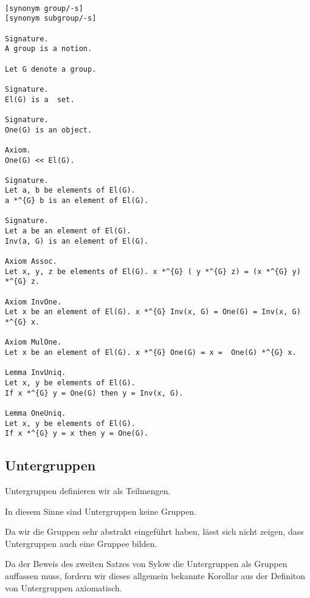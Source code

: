 \documentclass[a4paper,12pt]{scrartcl}
\begin{document}
\begin{lstlisting}

[synonym group/-s]
[synonym subgroup/-s]

Signature.
A group is a notion.

Let G denote a group.

Signature.
El(G) is a  set.

Signature.
One(G) is an object.

Axiom.
One(G) << El(G).

Signature.
Let a, b be elements of El(G).
a *^{G} b is an element of El(G).

Signature.
Let a be an element of El(G).
Inv(a, G) is an element of El(G).

Axiom Assoc.
Let x, y, z be elements of El(G). x *^{G} ( y *^{G} z) = (x *^{G} y) *^{G} z. 

Axiom InvOne.
Let x be an element of El(G). x *^{G} Inv(x, G) = One(G) = Inv(x, G) *^{G} x.

Axiom MulOne.
Let x be an element of El(G). x *^{G} One(G) = x =  One(G) *^{G} x.

Lemma InvUniq.
Let x, y be elements of El(G).
If x *^{G} y = One(G) then y = Inv(x, G).

Lemma OneUniq.
Let x, y be elements of El(G).
If x *^{G} y = x then y = One(G).

\end{lstlisting}

\subsection{Untergruppen}

Untergruppen definieren wir als Teilmengen.

In diesem Sinne sind Untergruppen keine Gruppen.

Da wir die Gruppen sehr abstrakt eingeführt haben, lässt sich nicht zeigen, dass Untergruppen auch eine Gruppee bilden.

Da der Beweis des zweiten Satzes von Sylow die Untergruppen als Gruppen auffassen muss, fordern wir dieses allgemein bekannte Korollar aus der Definiton von Untergruppen axiomatisch.
\end{document}
